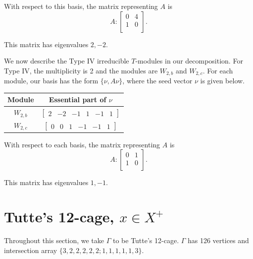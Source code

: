 \documentclass[12pt,letterpaper]{article}
\newcommand{\rowvector}[1]{\begin{bmatrix} #1 \end{bmatrix}}
\newcommand{\GraphNumber}{}
\newcommand{\GraphTitle}{}
\newcommand{\VertexCount}{}
\newcommand{\IntersectionArray}{}
\newcommand{\DateString}{}
\begin{document}
With respect to this basis, the matrix representing $A$ is
\begin{equation}
    A: \begin{bmatrix}
  0 & 4 \\
  1 & 0 \\
\end{bmatrix}.
\label{eq:des-III}
\end{equation}

This matrix has eigenvalues $2, -2$.

We now describe the Type IV irreducible $T$-modules in our decomposition. For Type IV, the multiplicity is 2 and the modules are $W_{2,b}$ and $W_{2,c}$. For each module, our basis has the form $\{\nu, A\nu\}$, where the seed vector $\nu$ is given below.
\begin{center}
    \begin{tabular}{c | c}
    \toprule
       \textbf{Module}  & \textbf {Essential part of }$\nu$ \\
       \midrule
       $W_{2,b}$  & $\rowvector{2 & -2 & -1 & 1 & -1 & 1}$ \\[1.67pt]
       $W_{2,c}$  & $\rowvector{0 & 0 & 1 & -1 & -1 & 1}$ \\
    \bottomrule
    \end{tabular}
\end{center}

With respect to each basis, the matrix representing $A$ is 
\begin{equation}
    A: \begin{bmatrix}
  0 & 1 \\
  1 & 0 \\
\end{bmatrix}.
\label{eq:des-IV}
\end{equation}

This matrix has eigenvalues $1, -1$.



\renewcommand{\GraphNumber}{11}
\renewcommand{\GraphTitle}{Tutte's 12-cage}
\renewcommand{\VertexCount}{126}
\renewcommand{\IntersectionArray}{\{3,2,2,2,2,2;1,1,1,1,1,3\}}
\renewcommand{\DateString}{2026.04.12 (orig. 2026.01)}

\section{\texorpdfstring{Tutte's 12-cage, $x \in X^+$}{Tutte's 12-cage, x in X+}}
Throughout this section, we take $\Gamma$ to be Tutte's 12-cage. $\Gamma$ has 126 vertices and intersection array $\{3,2,2,2,2,2;1,1,1,1,1,3\}$.
\end{document}
